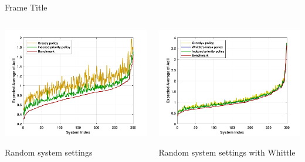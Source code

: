 \documentclass[notheorems, aspectratio=169]{beamer}
\begin{document}
\begin{frame}{Frame Title}
\begin{columns}
\begin{column}{0.5\textwidth}

\begin{center}
\begin{figures}
    \includegraphics[width=\linewidth]{Figures/Random.pdf}
\end{figures}
 Random system settings
\end{center}

\end{column}
\begin{column}{0.5\textwidth}

\begin{center}
\begin{figures}
    \includegraphics[width=\linewidth]{Figures/Random_Whittle.pdf}
\end{figures}
 Random system settings with Whittle
\end{center}

\end{column}
\end{columns}

\end{frame}
\end{document}

